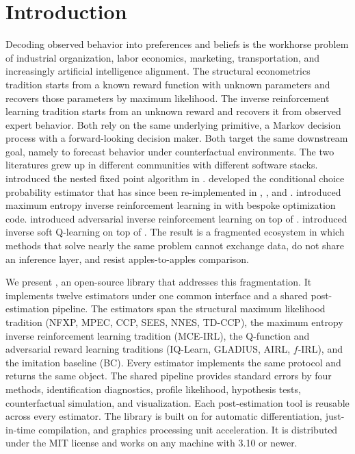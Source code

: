 \section{Introduction} \label{sec:intro}

Decoding observed behavior into preferences and beliefs is the workhorse problem of industrial organization, labor economics, marketing, transportation, and increasingly artificial intelligence alignment. The structural econometrics tradition starts from a known reward function with unknown parameters and recovers those parameters by maximum likelihood. The inverse reinforcement learning tradition starts from an unknown reward and recovers it from observed expert behavior. Both rely on the same underlying primitive, a Markov decision process with a forward-looking decision maker. Both target the same downstream goal, namely to forecast behavior under counterfactual environments. The two literatures grew up in different communities with different software stacks. \citet{rust1987} introduced the nested fixed point algorithm in . \citet{hotz1993} developed the conditional choice probability estimator that has since been re-implemented in , , and . \citet{ziebart2008} introduced maximum entropy inverse reinforcement learning in  with bespoke optimization code. \citet{fu2018} introduced adversarial inverse reinforcement learning on top of . \citet{garg2021} introduced inverse soft Q-learning on top of . The result is a fragmented ecosystem in which methods that solve nearly the same problem cannot exchange data, do not share an inference layer, and resist apples-to-apples comparison.

We present , an open-source  library that addresses this fragmentation. It implements twelve estimators under one common interface and a shared post-estimation pipeline. The estimators span the structural maximum likelihood tradition (NFXP, MPEC, CCP, SEES, NNES, TD-CCP), the maximum entropy inverse reinforcement learning tradition (MCE-IRL), the Q-function and adversarial reward learning traditions (IQ-Learn, GLADIUS, AIRL, $f$-IRL), and the imitation baseline (BC). Every estimator implements the same  protocol and returns the same  object. The shared pipeline provides standard errors by four methods, identification diagnostics, profile likelihood, hypothesis tests, counterfactual simulation, and visualization. Each post-estimation tool is reusable across every estimator. The library is built on  \citep{jax2018github} for automatic differentiation, just-in-time compilation, and graphics processing unit acceleration. It is distributed under the MIT license and works on any machine with  3.10 or newer.

